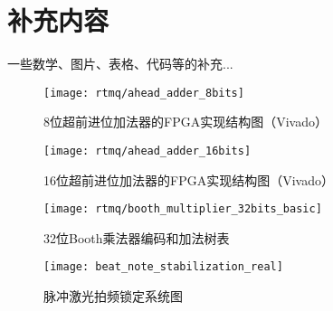 
\chapter{补充内容}

一些数学、图片、表格、代码等的补充... 

\begin{figure}
    \centering
    \caption[8位超前进位加法器的FPGA实现结构图]{8位超前进位加法器的FPGA实现结构图（Vivado）\label{fig:ahead_adder_8bits}}
    \texttt{[image: rtmq/ahead\_adder\_8bits]}
\end{figure}

\begin{figure}
    \centering
    \caption[16位超前进位加法器的FPGA实现结构图]{16位超前进位加法器的FPGA实现结构图（Vivado）\label{fig:ahead_adder_16bits}}
    \texttt{[image: rtmq/ahead\_adder\_16bits]}
\end{figure}


\begin{figure}
    \centering
    \caption[32位Booth乘法器编码和加法树表]{32位Booth乘法器编码和加法树表\label{fig:booth_multiplier_32bits_basic}}
    \texttt{[image: rtmq/booth\_multiplier\_32bits\_basic]}
\end{figure}

\begin{figure}
    \centering
    \caption[脉冲激光拍频锁定系统图]{脉冲激光拍频锁定系统图\label{fig:beat_note_stabilization_real}}
    \texttt{[image: beat\_note\_stabilization\_real]}
\end{figure}